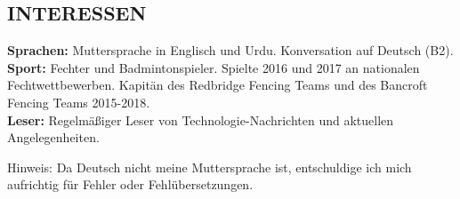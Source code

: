 \documentclass[margin, 10pt]{res} %
\begin{document}
\begin{resume}
\section{INTERESSEN} 
\textbf{Sprachen:} Muttersprache in Englisch und Urdu. Konversation auf Deutsch (B2).\\
\textbf{Sport:} Fechter und Badmintonspieler. Spielte 2016 und 2017 an nationalen Fechtwettbewerben. Kapitän des Redbridge Fencing Teams und des Bancroft Fencing Teams 2015-2018.\\
\textbf{Leser:} Regelmäßiger Leser von Technologie-Nachrichten und aktuellen Angelegenheiten.

Hinweis: Da Deutsch nicht meine Muttersprache ist, entschuldige ich mich aufrichtig für Fehler oder Fehlübersetzungen.

\end{resume}
\end{document}
